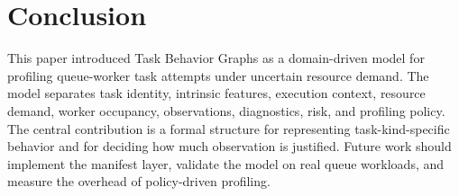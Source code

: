 \section{Conclusion}
\label{sec:conclusion}

This paper introduced Task Behavior Graphs as a domain-driven model for
profiling queue-worker task attempts under uncertain resource demand. The model
separates task identity, intrinsic features, execution context, resource demand,
worker occupancy, observations, diagnostics, risk, and profiling policy. The
central contribution is a formal structure for representing task-kind-specific
behavior and for deciding how much observation is justified. Future work should
implement the manifest layer, validate the model on real queue workloads, and
measure the overhead of policy-driven profiling.
